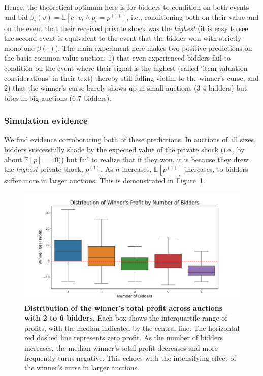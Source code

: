 \documentclass{article} %
\begin{document}
Hence, the theoretical optimum here is for bidders to condition on both events and bid $\beta_i(v) = \mathbb{E}[c \, | \, v_i \wedge p_i = p^{(1)}]$, i.e., conditioning both on their value and on the event that their received private shock was the \textit{highest} (it is easy to see the second event is equivalent to the event that the bidder won with strictly monotone $\beta(\cdot)$). 
The main experiment here \cite{kagel1986winner} makes two positive predictions on the basic common value auction: 1) that even experienced bidders fail to condition on the event where their signal is the highest (called `item valuation considerations' in their text) thereby still falling victim to the winner's curse, and 2) that the winner's curse barely shows up in small auctions (3-4 bidders) but bites in big auctions (6-7 bidders). 

\subsubsection{Simulation evidence}
We find evidence corroborating both of these predictions. 
In auctions of all sizes, bidders successfully shade by the expected value of the private shock (i.e., by about $\mathbb{E}[p] = 10)$) but fail to realize that if they won, it is because they drew the \textit{highest} private shock, $p^{(1)}$. 
As $n$ increases, $\mathbb{E}[p^{(1)}]$ increases, so bidders suffer more in larger auctions. 
This is demonstrated in Figure~\ref{fig:winner}. 

\begin{figure}[h]  %
    
    \centering  %
    \includegraphics[width=\linewidth]{Figs/cv_plot.png}  %
    \caption{\textbf{Distribution of the winner’s total profit across auctions with 2 to 6 bidders.} Each box shows the interquartile range of profits, with the median indicated by the central line. The horizontal red dashed line represents zero profit. As the number of bidders increases, the median winner's total profit decreases and more frequently turns negative. This echoes with the intensifying effect of the winner's curse in larger auctions.}
    \label{fig:winner}

\end{figure}
\end{document}
